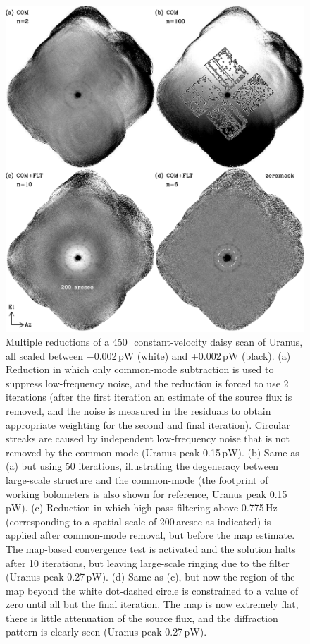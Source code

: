 \documentclass[useAMS,usenatbib,nofootinbib]{mn2e}
\begin{document}
\begin{figure}
\centering
\includegraphics[width=\linewidth]{pointmaps.pdf}
\caption{Multiple reductions of a 450\,\micron\ constant-velocity
  daisy scan of Uranus, all scaled between $-$0.002\,pW (white) and
  +0.002\,pW (black). (a) Reduction in which only common-mode
  subtraction is used to suppress low-frequency noise, and the
  reduction is forced to use 2 iterations (after the first iteration
  an estimate of the source flux is removed, and the noise is measured
  in the residuals to obtain appropriate weighting for the second and
  final iteration). Circular streaks are caused by independent
  low-frequency noise that is not removed by the common-mode (Uranus
  peak 0.15\,pW). (b) Same as (a) but using 50 iterations,
  illustrating the degeneracy between large-scale structure and the
  common-mode (the footprint of working bolometers is also shown for
  reference, Uranus peak 0.15\,pW). (c) Reduction in which high-pass
  filtering above 0.775\,Hz (corresponding to a spatial scale of
  200\,arcsec as indicated) is applied after common-mode removal, but
  before the map estimate. The map-based convergence test is activated
  and the solution halts after 10 iterations, but leaving large-scale
  ringing due to the filter (Uranus peak 0.27\,pW). (d) Same as (c),
  but now the region of the map beyond the white dot-dashed circle is
  constrained to a value of zero until all but the final iteration.
  The map is now extremely flat, there is little attenuation of the
  source flux, and the diffraction pattern is clearly seen (Uranus
  peak 0.27\,pW).}
\label{fig:pointmaps}
\end{figure}
\end{document}
